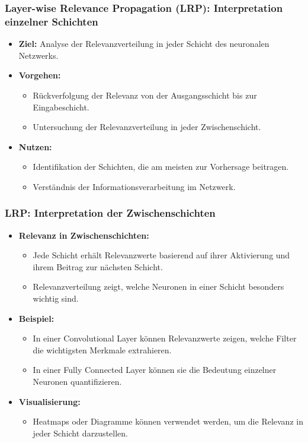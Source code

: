 \documentclass[aspectratio=1610, xcolor=dvipsnames, 9pt]{beamer}
\begin{document}
\begin{frame}
  \frametitle{Layer-wise Relevance Propagation (LRP): Interpretation einzelner Schichten}
  \begin{itemize}
    \item \textbf{Ziel:} Analyse der Relevanzverteilung in jeder Schicht des neuronalen Netzwerks.
    \item \textbf{Vorgehen:}
    \begin{itemize}
      \item Rückverfolgung der Relevanz von der Ausgangsschicht bis zur Eingabeschicht.
      \item Untersuchung der Relevanzverteilung in jeder Zwischenschicht.
    \end{itemize}
    \item \textbf{Nutzen:}
    \begin{itemize}
      \item Identifikation der Schichten, die am meisten zur Vorhersage beitragen.
      \item Verständnis der Informationsverarbeitung im Netzwerk.
    \end{itemize}
  \end{itemize}
\end{frame}

\begin{frame}
  \frametitle{LRP: Interpretation der Zwischenschichten}
  \begin{itemize}
    \item \textbf{Relevanz in Zwischenschichten:}
    \begin{itemize}
      \item Jede Schicht erhält Relevanzwerte basierend auf ihrer Aktivierung und ihrem Beitrag zur nächsten Schicht.
      \item Relevanzverteilung zeigt, welche Neuronen in einer Schicht besonders wichtig sind.
    \end{itemize}
    \item \textbf{Beispiel:}
    \begin{itemize}
      \item In einer Convolutional Layer können Relevanzwerte zeigen, welche Filter die wichtigsten Merkmale extrahieren.
      \item In einer Fully Connected Layer können sie die Bedeutung einzelner Neuronen quantifizieren.
    \end{itemize}
    \item \textbf{Visualisierung:}
    \begin{itemize}
      \item Heatmaps oder Diagramme können verwendet werden, um die Relevanz in jeder Schicht darzustellen.
    \end{itemize}
  \end{itemize}
\end{frame}
\end{document}
